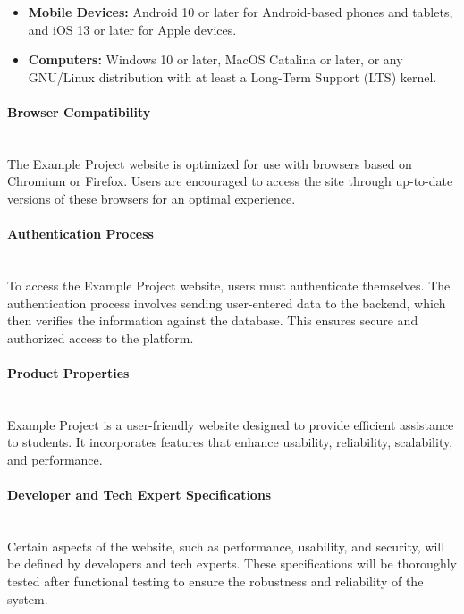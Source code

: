 \documentclass[12pt,a4paper]{article}
\begin{document}
\begin{spacing}{1.5}
    \begin{itemize}
        \item \textbf{Mobile Devices:} Android 10 or later for Android-based phones and tablets, and iOS 13 or later for Apple devices.
        \item \textbf{Computers:} Windows 10 or later, MacOS Catalina or later, or any GNU/Linux distribution with at least a Long-Term Support (LTS) kernel.
    \end{itemize}

    \paragraph{Browser Compatibility} \mbox{} \\ \indent
    The Example Project website is optimized for use with browsers based on Chromium or Firefox. Users are encouraged to access the site through up-to-date versions of these browsers for an optimal experience.

    \paragraph{Authentication Process} \mbox{} \\ \indent
    To access the Example Project website, users must authenticate themselves. The authentication process involves sending user-entered data to the backend, which then verifies the information against the database. This ensures secure and authorized access to the platform.

    \paragraph{Product Properties} \mbox{} \\ \indent
    Example Project is a user-friendly website designed to provide efficient assistance to students. It incorporates features that enhance usability, reliability, scalability, and performance.

    \paragraph{Developer and Tech Expert Specifications} \mbox{} \\ \indent
    Certain aspects of the website, such as performance, usability, and security, will be defined by developers and tech experts. These specifications will be thoroughly tested after functional testing to ensure the robustness and reliability of the system.


\end{spacing}
\end{document}
